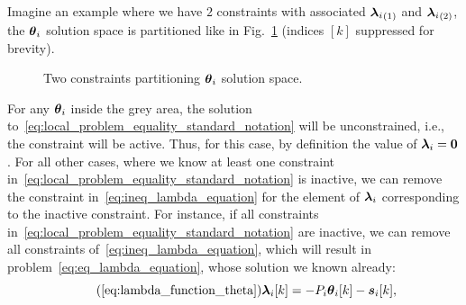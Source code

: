 \documentclass[../main.tex]{subfiles}
\begin{document}
Imagine an example where we have $2$ constraints with associated $\elem[1]{\lambdai}$ and $\elem[2]{\lambdai}$, the $\thetai$ solution space is partitioned like in Fig.~\ref{fig:constraints_partition_theta} (indices $[k]$ suppressed for brevity).
\begin{figure}[h]
  \centering
  \caption{Two constraints partitioning $\thetai$ solution space.}\label{fig:constraints_partition_theta}
\end{figure}
For any $\thetai$ inside the grey area, the solution to~\eqref{eq:local_problem_equality_standard_notation} will be unconstrained, i.e., the constraint will be active.
Thus, for this case, by definition the value of $\lambdai=\0$.
For all other cases, where we know at least one constraint in~\eqref{eq:local_problem_equality_standard_notation} is inactive, we can remove the constraint in~\eqref{eq:ineq_lambda_equation} for the element of $\lambdai$ corresponding to the inactive constraint.
For instance, if all constraints in~\eqref{eq:local_problem_equality_standard_notation} are inactive, we can remove all constraints of~\eqref{eq:ineq_lambda_equation}, which will result in problem~\eqref{eq:eq_lambda_equation}, whose solution we known already:
\begin{equation}
  \label{eq:lambda_function_theta_reprise}
  \tag{\ref*{eq:lambda_function_theta}}
  \lambdaik=-\Plin\thetaik-\sik,
\end{equation}
\newcommand{\Plinineqnonzero}[1][\star]{\overset{#1}{\Plin}}
\newcommand{\sikineqnonzero}[1][\star]{\overset{#1}{\vec{s}_{i}}[k]}
\end{document}
